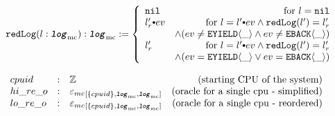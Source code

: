 \begin{figure}
\noindent{}
$$
\mcreducelogfunckwd (l : \mclog) : \mclog := 
 \left\{\begin{array}{lr}
\nulllist & \text{for } l = \nulllist \\
\listconsoppo{ev}{l_r'} & \text{for } l = \listconsoppo{ev}{l'} \wedge \mcreducelogfunc{l'}{l_r'}\\
&\wedge(ev \neq \yieldev{\_} \wedge ev \neq \yieldbackev{\_})\\
l_r' & \text{for } l = \listconsoppo{ev}{l'} \wedge \mcreducelogfunc{l'}{l_r'}\\
&\wedge (ev = \yieldev{\_} \vee ev = \yieldbackev{\_})\\
\end{array} \right.
$$

\noindent{}
$$
\begin{array}{lllr}
cpuid & : & {\mathbb{Z}} & \mbox{(starting CPU of the system)}\\
hi\_re\_o & : & {{{\varepsilon_{mc}}}_{[{\{cpuid\}}, {{{\mathrm{\texttt{\textbf{\textit{log}}}}}_{\mathrm{mc}}}}, {{{\mathrm{\texttt{\textbf{\textit{log}}}}}_{\mathrm{mc}}}}]}} &  \mbox{(oracle for a single cpu - simplified)}\\
lo\_re\_o & : & {{{\varepsilon_{mc}}}_{[{\{cpuid\}}, {{{\mathrm{\texttt{\textbf{\textit{log}}}}}_{\mathrm{mc}}}}, {{{\mathrm{\texttt{\textbf{\textit{log}}}}}_{\mathrm{mc}}}}]}} &  \mbox{(oracle for a single cpu - reordered)}\\
\end{array}
$$


\end{figure}
